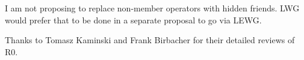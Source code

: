 \vspace{1.5cm}

I am not proposing to replace non-member operators with hidden friends.
LWG would prefer that to be done in a separate proposal to go via LEWG.

Thanks to Tomasz Kaminski and Frank Birbacher for their detailed reviews of R0.

\newpage


{}
\hypertarget{toctarget}{\tableofcontents*}

\setcounter{tocdepth}{5}

%

